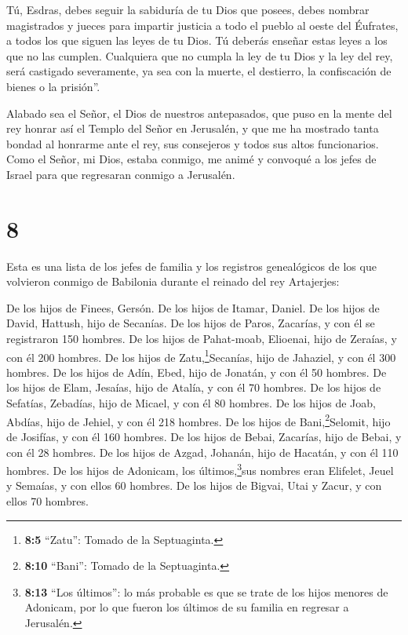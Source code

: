  Tú, Esdras, debes seguir la sabiduría de tu Dios que
posees, debes nombrar magistrados y jueces para impartir justicia a todo
el pueblo al oeste del Éufrates, a todos los que siguen las leyes de tu
Dios. Tú deberás enseñar estas leyes a los que no las cumplen.
 Cualquiera que no cumpla la ley de tu Dios y la ley del
rey, será castigado severamente, ya sea con la muerte, el destierro, la
confiscación de bienes o la prisión''.

 Alabado sea el Señor, el Dios de nuestros antepasados, que
puso en la mente del rey honrar así el Templo del Señor en Jerusalén,
 y que me ha mostrado tanta bondad al honrarme ante el rey,
sus consejeros y todos sus altos funcionarios. Como el Señor, mi Dios,
estaba conmigo, me animé y convoqué a los jefes de Israel para que
regresaran conmigo a Jerusalén.

\hypertarget{section-7}{%
\section{8}\label{section-7}}

 Esta es una lista de los jefes de familia y los registros
genealógicos de los que volvieron conmigo de Babilonia durante el
reinado del rey Artajerjes:

 De los hijos de Finees, Gersón. De los hijos de Itamar,
Daniel. De los hijos de David, Hattush,  hijo de Secanías.
De los hijos de Paros, Zacarías, y con él se registraron 150 hombres.
 De los hijos de Pahat-moab, Elioenai, hijo de Zeraías, y
con él 200 hombres.  De los hijos de
Zatu,\footnote{\textbf{8:5} ``Zatu'': Tomado de la Septuaginta.}Secanías,
hijo de Jahaziel, y con él 300 hombres.  De los hijos de
Adín, Ebed, hijo de Jonatán, y con él 50 hombres.  De los
hijos de Elam, Jesaías, hijo de Atalía, y con él 70 hombres.
 De los hijos de Sefatías, Zebadías, hijo de Micael, y con
él 80 hombres.  De los hijos de Joab, Abdías, hijo de
Jehiel, y con él 218 hombres.  De los hijos de
Bani,\footnote{\textbf{8:10} ``Bani'': Tomado de la Septuaginta.}Selomit,
hijo de Josifías, y con él 160 hombres.  De los hijos de
Bebai, Zacarías, hijo de Bebai, y con él 28 hombres.  De
los hijos de Azgad, Johanán, hijo de Hacatán, y con él 110 hombres.
 De los hijos de Adonicam, los últimos,\footnote{\textbf{8:13}
  ``Los últimos'': lo más probable es que se trate de los hijos menores
  de Adonicam, por lo que fueron los últimos de su familia en regresar a
  Jerusalén.}sus nombres eran Elifelet, Jeuel y Semaías, y con ellos 60
hombres.  De los hijos de Bigvai, Utai y Zacur, y con ellos
70 hombres.

